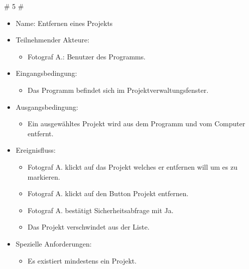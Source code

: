		\# 5 \#
		\begin{itemize}
			\item Name: Entfernen eines Projekts
			\item Teilnehmender Akteure:
			\begin{itemize}
				\item	Fotograf A.: Benutzer des Programms.	
			\end{itemize}
			\item Eingangsbedingung:
			\begin{itemize}
				\item	Das Programm befindet sich im Projektverwaltungsfenster.		
			\end{itemize}
			\item Ausgangsbedingung:
			\begin{itemize}
				\item	Ein ausgewähltes Projekt wird aus dem Programm und vom Computer entfernt.		
			\end{itemize}
			\item Ereignisfluss:
			\begin{itemize}
				\item Fotograf A. klickt auf das Projekt welches er entfernen will um es zu markieren.
				\item Fotograf A. klickt auf den Button Projekt entfernen.
				\item Fotograf A.	bestätigt Sicherheitsabfrage mit Ja.
				\item Das Projekt verschwindet aus der Liste.
			\end{itemize}
			\item Spezielle Anforderungen:
			\begin{itemize}
				\item	Es existiert mindestens ein Projekt.		
			\end{itemize}			
		\end{itemize}
		
